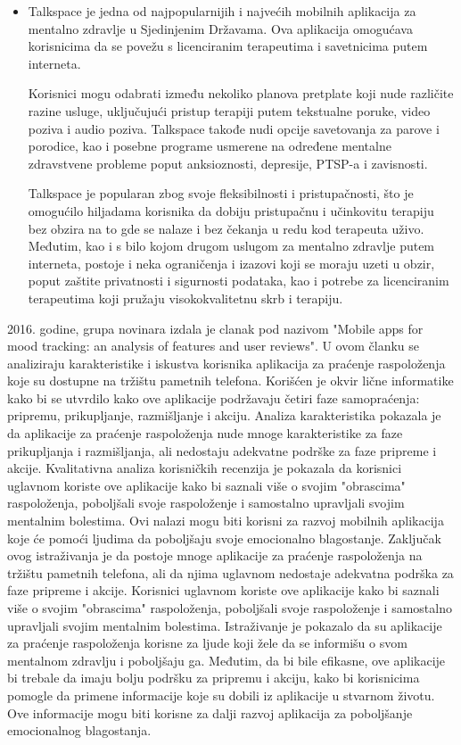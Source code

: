 \documentclass[a4paper]{article}
\begin{document}
\begin{itemize}
\item Talkspace je jedna od najpopularnijih i najvećih mobilnih aplikacija za mentalno zdravlje u Sjedinjenim Državama. Ova aplikacija omogućava korisnicima da se povežu s licenciranim terapeutima i savetnicima putem interneta.

Korisnici mogu odabrati između nekoliko planova pretplate koji nude različite razine usluge, uključujući pristup terapiji putem tekstualne poruke, video poziva i audio poziva. Talkspace takođe nudi opcije savetovanja za parove i porodice, kao i posebne programe usmerene na određene mentalne zdravstvene probleme poput anksioznosti, depresije, PTSP-a i zavisnosti.

Talkspace je popularan zbog svoje fleksibilnosti i pristupačnosti, što je omogućilo hiljadama korisnika da dobiju pristupačnu i učinkovitu terapiju bez obzira na to gde se nalaze i bez čekanja u redu kod terapeuta uživo. Međutim, kao i s bilo kojom drugom uslugom za mentalno zdravlje putem interneta, postoje i neka ograničenja i izazovi koji se moraju uzeti u obzir, poput zaštite privatnosti i sigurnosti podataka, kao i potrebe za licenciranim terapeutima koji pružaju visokokvalitetnu skrb i terapiju.

\end{itemize}

2016. godine, grupa novinara izdala je clanak pod nazivom "Mobile apps for mood tracking: an analysis of features and user reviews". U ovom članku se analiziraju karakteristike i iskustva korisnika aplikacija za praćenje raspoloženja koje su dostupne na tržištu pametnih telefona. Korišćen je okvir lične informatike kako bi se utvrdilo kako ove aplikacije podržavaju četiri faze samopraćenja: pripremu, prikupljanje, razmišljanje i akciju. Analiza karakteristika pokazala je da aplikacije za praćenje raspoloženja nude mnoge karakteristike za faze prikupljanja i razmišljanja, ali nedostaju adekvatne podrške za faze pripreme i akcije. Kvalitativna analiza korisničkih recenzija je pokazala da korisnici uglavnom koriste ove aplikacije kako bi saznali više o svojim "obrascima" raspoloženja, poboljšali svoje raspoloženje i samostalno upravljali svojim mentalnim bolestima. Ovi nalazi mogu biti korisni za razvoj mobilnih aplikacija koje će pomoći ljudima da poboljšaju svoje emocionalno blagostanje.
Zaključak ovog istraživanja je da postoje mnoge aplikacije za praćenje raspoloženja na tržištu pametnih telefona, ali da njima uglavnom nedostaje adekvatna podrška za faze pripreme i akcije. Korisnici uglavnom koriste ove aplikacije kako bi saznali više o svojim "obrascima" raspoloženja, poboljšali svoje raspoloženje i samostalno upravljali svojim mentalnim bolestima.
Istraživanje je pokazalo da su aplikacije za praćenje raspoloženja korisne za ljude koji žele da se informišu o svom mentalnom zdravlju i poboljšaju ga. Međutim, da bi bile efikasne, ove aplikacije bi trebale da imaju bolju podršku za pripremu i akciju, kako bi korisnicima pomogle da primene informacije koje su dobili iz aplikacije u stvarnom životu. Ove informacije mogu biti korisne za dalji razvoj aplikacija za poboljšanje emocionalnog blagostanja.
\end{document}
